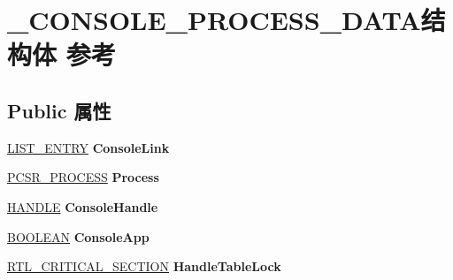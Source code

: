 \hypertarget{struct___c_o_n_s_o_l_e___p_r_o_c_e_s_s___d_a_t_a}{}\section{\+\_\+\+C\+O\+N\+S\+O\+L\+E\+\_\+\+P\+R\+O\+C\+E\+S\+S\+\_\+\+D\+A\+T\+A结构体 参考}
\label{struct___c_o_n_s_o_l_e___p_r_o_c_e_s_s___d_a_t_a}
\subsection*{Public 属性}
\begin{DoxyCompactItemize}
\item 
\mbox{\label{struct___c_o_n_s_o_l_e___p_r_o_c_e_s_s___d_a_t_a_aeb9a8bcb48dc56600e062a163732f673}} 
\hyperlink{struct___l_i_s_t___e_n_t_r_y}{L\+I\+S\+T\+\_\+\+E\+N\+T\+RY} {\bfseries Console\+Link}
\item 
\mbox{\label{struct___c_o_n_s_o_l_e___p_r_o_c_e_s_s___d_a_t_a_a2dff9e8d5c601cd84034e9a4786adb2e}} 
\hyperlink{struct___c_s_r___p_r_o_c_e_s_s}{P\+C\+S\+R\+\_\+\+P\+R\+O\+C\+E\+SS} {\bfseries Process}
\item 
\mbox{\label{struct___c_o_n_s_o_l_e___p_r_o_c_e_s_s___d_a_t_a_a10086638b442c3a8f57035605fe3908e}} 
\hyperlink{interfacevoid}{H\+A\+N\+D\+LE} {\bfseries Console\+Handle}
\item 
\mbox{\label{struct___c_o_n_s_o_l_e___p_r_o_c_e_s_s___d_a_t_a_aeaca3c129885c6c0c06525932f0aab24}} 
\hyperlink{_processor_bind_8h_a112e3146cb38b6ee95e64d85842e380a}{B\+O\+O\+L\+E\+AN} {\bfseries Console\+App}
\item 
\mbox{\label{struct___c_o_n_s_o_l_e___p_r_o_c_e_s_s___d_a_t_a_a8d4e34919f9cdfb877123e90fca83ac0}} 
\hyperlink{struct___r_t_l___c_r_i_t_i_c_a_l___s_e_c_t_i_o_n}{R\+T\+L\+\_\+\+C\+R\+I\+T\+I\+C\+A\+L\+\_\+\+S\+E\+C\+T\+I\+ON} {\bfseries Handle\+Table\+Lock}
\item 
\mbox{\label{struct___c_o_n_s_o_l_e___p_r_o_c_e_s_s___d_a_t_a_a0bdfe5fcd1a6338ce124666ac711527a}} 

\end{DoxyCompactItemize}
